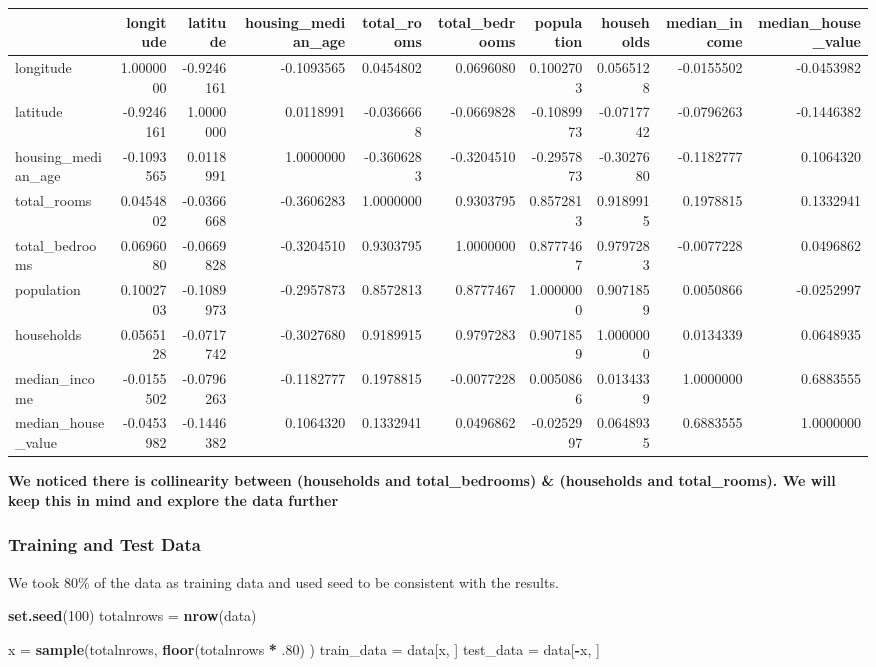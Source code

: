 \documentclass[
]{article}
\newenvironment{Shaded}{\begin{snugshade}}{\end{snugshade}}
\newcommand{\DecValTok}[1]{\textcolor[rgb]{0.00,0.00,0.81}{#1}}
\newcommand{\FloatTok}[1]{\textcolor[rgb]{0.00,0.00,0.81}{#1}}
\newcommand{\KeywordTok}[1]{\textcolor[rgb]{0.13,0.29,0.53}{\textbf{#1}}}
\newcommand{\NormalTok}[1]{#1}
\newcommand{\OperatorTok}[1]{\textcolor[rgb]{0.81,0.36,0.00}{\textbf{#1}}}
\newcommand{\StringTok}[1]{\textcolor[rgb]{0.31,0.60,0.02}{#1}}
\begin{document}
\begin{longtable}[]{@{}lrrrrrrrrr@{}}
\toprule
& longitude & latitude & housing\_median\_age & total\_rooms &
total\_bedrooms & population & households & median\_income &
median\_house\_value\tabularnewline
\midrule
\endhead
longitude & 1.0000000 & -0.9246161 & -0.1093565 & 0.0454802 & 0.0696080
& 0.1002703 & 0.0565128 & -0.0155502 & -0.0453982\tabularnewline
latitude & -0.9246161 & 1.0000000 & 0.0118991 & -0.0366668 & -0.0669828
& -0.1089973 & -0.0717742 & -0.0796263 & -0.1446382\tabularnewline
housing\_median\_age & -0.1093565 & 0.0118991 & 1.0000000 & -0.3606283 &
-0.3204510 & -0.2957873 & -0.3027680 & -0.1182777 &
0.1064320\tabularnewline
total\_rooms & 0.0454802 & -0.0366668 & -0.3606283 & 1.0000000 &
0.9303795 & 0.8572813 & 0.9189915 & 0.1978815 & 0.1332941\tabularnewline
total\_bedrooms & 0.0696080 & -0.0669828 & -0.3204510 & 0.9303795 &
1.0000000 & 0.8777467 & 0.9797283 & -0.0077228 &
0.0496862\tabularnewline
population & 0.1002703 & -0.1089973 & -0.2957873 & 0.8572813 & 0.8777467
& 1.0000000 & 0.9071859 & 0.0050866 & -0.0252997\tabularnewline
households & 0.0565128 & -0.0717742 & -0.3027680 & 0.9189915 & 0.9797283
& 0.9071859 & 1.0000000 & 0.0134339 & 0.0648935\tabularnewline
median\_income & -0.0155502 & -0.0796263 & -0.1182777 & 0.1978815 &
-0.0077228 & 0.0050866 & 0.0134339 & 1.0000000 &
0.6883555\tabularnewline
median\_house\_value & -0.0453982 & -0.1446382 & 0.1064320 & 0.1332941 &
0.0496862 & -0.0252997 & 0.0648935 & 0.6883555 &
1.0000000\tabularnewline
\bottomrule
\end{longtable}

\textbf{We noticed there is collinearity between {(households and
total\_bedrooms) \& (households and total\_rooms)}. We will keep this in
mind and explore the data further}

\hypertarget{training-and-test-data}{%
\subsubsection{Training and Test Data}\label{training-and-test-data}}

We took 80\% of the data as training data and used seed to be consistent
with the results.

\begin{Shaded}
\begin{Highlighting}[]
\KeywordTok{set.seed}\NormalTok{(}\DecValTok{100}\NormalTok{)}
\NormalTok{totalnrows =}\StringTok{ }\KeywordTok{nrow}\NormalTok{(data)}

\NormalTok{x =}\StringTok{ }\KeywordTok{sample}\NormalTok{(totalnrows, }\KeywordTok{floor}\NormalTok{(totalnrows }\OperatorTok{*}\StringTok{ }\FloatTok{.80}\NormalTok{) )}
\NormalTok{train_data =}\StringTok{ }\NormalTok{data[x, ]}
\NormalTok{test_data =}\StringTok{ }\NormalTok{data[}\OperatorTok{-}\NormalTok{x, ]}
\end{Highlighting}
\end{Shaded}
\end{document}
